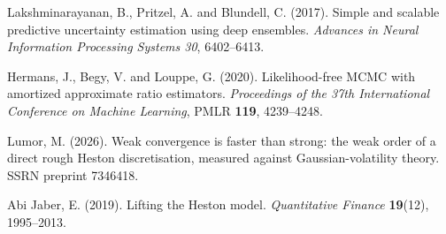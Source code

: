  Lakshminarayanan, B., Pritzel, A. and
Blundell, C. (2017). Simple and scalable predictive uncertainty estimation
using deep ensembles. \emph{Advances in Neural Information Processing
Systems 30}, 6402--6413.

 Hermans, J., Begy, V. and Louppe, G. (2020).
Likelihood-free MCMC with amortized approximate ratio estimators.
\emph{Proceedings of the 37th International Conference on Machine Learning},
PMLR \textbf{119}, 4239--4248.

 Lumor, M. (2026). Weak convergence is faster than
strong: the weak order of a direct rough Heston discretisation, measured
against Gaussian-volatility theory. SSRN preprint 7346418.

 Abi Jaber, E. (2019). Lifting the Heston model.
\emph{Quantitative Finance} \textbf{19}(12), 1995--2013.
